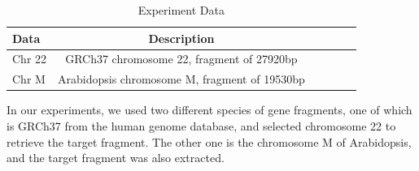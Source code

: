 \documentclass{PHlab-thesis}
\begin{document}
\begin{table}[h!]
  \renewcommand\arraystretch{2}
	\centering
	\begin{tabular}{l*{5}{c}}
    \hline
		Data              & Description\\
		\hline
		Chr 22 & GRCh37 chromosome 22, fragment of 27920bp  \\
		Chr M  & Arabidopsis chromosome M, fragment of 19530bp  \\
    \hline
	\end{tabular}
	\caption{Experiment Data}
	\label{table:1}
\end{table}
\par In our experiments, we used two different species of gene fragments, one of which is GRCh37 from the human genome database, and selected chromosome 22 to retrieve the target fragment. The other one is the chromosome M of Arabidopsis, and the target fragment was also extracted.
\end{document}
